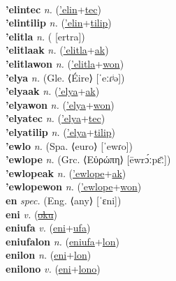  \label{'elin'kilistosfitilip} \\
\textbf{'elintec} \textit{n.} (\hyperref['elin]{'elin}+\hyperref[tec]{tec})
 \label{'elintec} \\
\textbf{'elintilip} \textit{n.} (\hyperref['elin]{'elin}+\hyperref[tilip]{tilip})
 \label{'elintilip} \\
\textbf{'elitla} \textit{n.} ( [ertra])
 \label{'elitla} \\
\textbf{'elitlaak} \textit{n.} (\hyperref['elitla]{'elitla}+\hyperref[ak]{ak})
 \label{'elitlaak} \\
\textbf{'elitlawon} \textit{n.} (\hyperref['elitla]{'elitla}+\hyperref[won]{won})
 \label{'elitlawon} \\
\textbf{'elya} \textit{n.} (Gle. ⟨Éire⟩ [ˈeːɾʲə])
 \label{'elya} \\
\textbf{'elyaak} \textit{n.} (\hyperref['elya]{'elya}+\hyperref[ak]{ak})
 \label{'elyaak} \\
\textbf{'elyawon} \textit{n.} (\hyperref['elya]{'elya}+\hyperref[won]{won})
 \label{'elyawon} \\
\textbf{'elyatec} \textit{n.} (\hyperref['elya]{'elya}+\hyperref[tec]{tec})
 \label{'elyatec} \\
\textbf{'elyatilip} \textit{n.} (\hyperref['elya]{'elya}+\hyperref[tilip]{tilip})
 \label{'elyatilip} \\
\textbf{'ewlo} \textit{n.} (Spa. ⟨euro⟩ [ˈewɾo])
 \label{'ewlo} \\
\textbf{'ewlope} \textit{n.} (Grc. ⟨Εὐρώπη⟩ [ēwrɔ́ːpɛ̄ː])
 \label{'ewlope} \\
\textbf{'ewlopeak} \textit{n.} (\hyperref['ewlope]{'ewlope}+\hyperref[ak]{ak})
 \label{'ewlopeak} \\
\textbf{'ewlopewon} \textit{n.} (\hyperref['ewlope]{'ewlope}+\hyperref[won]{won})
 \label{'ewlopewon} \\
\textbf{en} \textit{spec.} (Eng. ⟨any⟩ [ˈɛni])
 \label{en} \\
\textbf{eni} \textit{v.} (\hyperref[oku]{\sout{oku}})
 \label{eni} \\
\textbf{eniufa} \textit{v.} (\hyperref[eni]{eni}+\hyperref[ufa]{ufa})
 \label{eniufa} \\
\textbf{eniufalon} \textit{n.} (\hyperref[eniufa]{eniufa}+\hyperref[lon]{lon})
 \label{eniufalon} \\
\textbf{enilon} \textit{n.} (\hyperref[eni]{eni}+\hyperref[lon]{lon})
 \label{enilon} \\
\textbf{enilono} \textit{v.} (\hyperref[eni]{eni}+\hyperref[lono]{lono})
